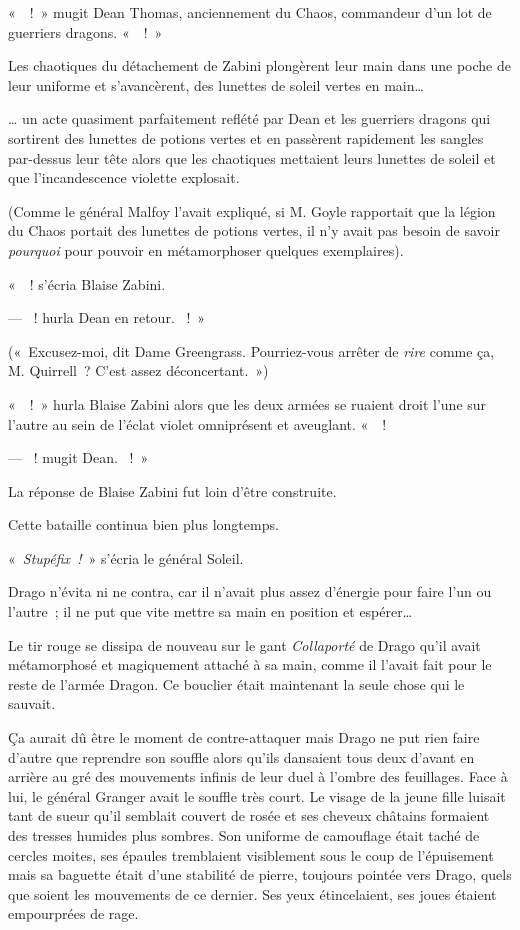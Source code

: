 «~~!~»
mugit Dean Thomas, anciennement du Chaos, commandeur d'un lot de guerriers dragons.
«~~!~»

Les chaotiques du détachement de Zabini plongèrent leur main dans une poche de leur uniforme et s'avancèrent, des lunettes de soleil vertes en main…

… un acte quasiment parfaitement reflété par Dean et les guerriers dragons qui sortirent des lunettes de potions vertes et en passèrent rapidement les sangles par-dessus leur tête alors que les chaotiques mettaient leurs lunettes de soleil et que l'incandescence violette explosait.

(Comme le général Malfoy l'avait expliqué, si M. Goyle rapportait que la légion du Chaos portait des lunettes de potions vertes, il n'y avait pas besoin de savoir \emph{pourquoi} pour pouvoir en métamorphoser quelques exemplaires).

«~~! s'écria Blaise Zabini.

--- ~! hurla Dean en retour.
~!~»

(«~Excusez-moi, dit Dame Greengrass.
Pourriez-vous arrêter de \emph{rire} comme ça, M. Quirrell~?
C'est assez déconcertant.~»)

«~~!~»
hurla Blaise Zabini alors que les deux armées se ruaient droit l'une sur l'autre au sein de l'éclat violet omniprésent et aveuglant.
«~~!

--- ~! mugit Dean.
~!~»

La réponse de Blaise Zabini fut loin d'être construite.

Cette bataille continua bien plus longtemps.

\later

«~\emph{Stupéfix~!}~» s'écria le général Soleil.

Drago n'évita ni ne contra, car il n'avait plus assez d'énergie pour faire l'un ou l'autre~; il ne put que vite mettre sa main en position et espérer…

Le tir rouge se dissipa de nouveau sur le gant \emph{Collaporté} de Drago qu'il avait métamorphosé et magiquement attaché à sa main, comme il l'avait fait pour le reste de l'armée Dragon.
Ce bouclier était maintenant la seule chose qui le sauvait.

Ça aurait dû être le moment de contre-attaquer mais Drago ne put rien faire d'autre que reprendre son souffle alors qu'ils dansaient tous deux d'avant en arrière au gré des mouvements infinis de leur duel à l'ombre des feuillages.
Face à lui, le général Granger avait le souffle très court.
Le visage de la jeune fille luisait tant de sueur qu'il semblait couvert de rosée et ses cheveux châtains formaient des tresses humides plus sombres.
Son uniforme de camouflage était taché de cercles moites, ses épaules tremblaient visiblement sous le coup de l'épuisement mais sa baguette était d'une stabilité de pierre, toujours pointée vers Drago, quels que soient les mouvements de ce dernier.
Ses yeux étincelaient, ses joues étaient empourprées de rage.

